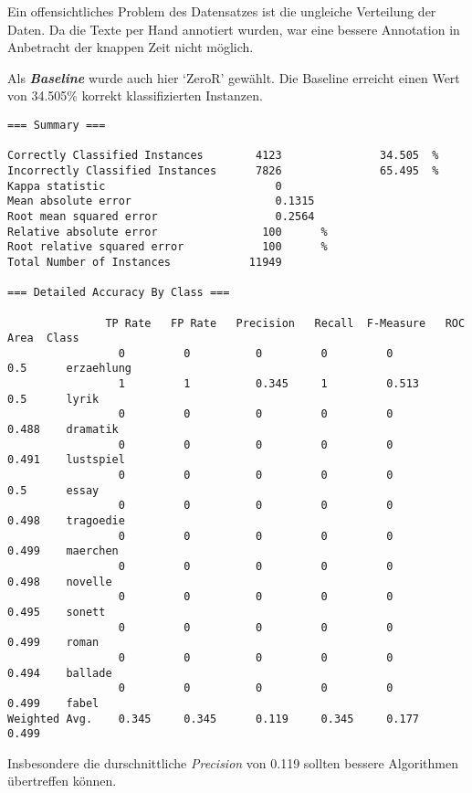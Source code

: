 \documentclass[]{article}
\begin{document}
Ein offensichtliches Problem des Datensatzes ist die ungleiche
Verteilung der Daten. Da die Texte per Hand annotiert wurden, war eine
bessere Annotation in Anbetracht der knappen Zeit nicht möglich.

Als \textbf{\emph{Baseline}} wurde auch hier `ZeroR' gewählt. Die
Baseline erreicht einen Wert von 34.505\% korrekt klassifizierten
Instanzen.

\begin{small}
\vspace{4 mm}\begin{verbatim}
=== Summary ===

Correctly Classified Instances        4123               34.505  %
Incorrectly Classified Instances      7826               65.495  %
Kappa statistic                          0     
Mean absolute error                      0.1315
Root mean squared error                  0.2564
Relative absolute error                100      %
Root relative squared error            100      %
Total Number of Instances            11949     

=== Detailed Accuracy By Class ===

               TP Rate   FP Rate   Precision   Recall  F-Measure   ROC Area  Class
                 0         0          0         0         0          0.5      erzaehlung
                 1         1          0.345     1         0.513      0.5      lyrik
                 0         0          0         0         0          0.488    dramatik
                 0         0          0         0         0          0.491    lustspiel
                 0         0          0         0         0          0.5      essay
                 0         0          0         0         0          0.498    tragoedie
                 0         0          0         0         0          0.499    maerchen
                 0         0          0         0         0          0.498    novelle
                 0         0          0         0         0          0.495    sonett
                 0         0          0         0         0          0.499    roman
                 0         0          0         0         0          0.494    ballade
                 0         0          0         0         0          0.499    fabel
Weighted Avg.    0.345     0.345      0.119     0.345     0.177      0.499
\end{verbatim}\vspace{4 mm}
\end{small}

Insbesondere die durschnittliche \emph{Precision} von 0.119 sollten
bessere Algorithmen übertreffen können.
\end{document}
